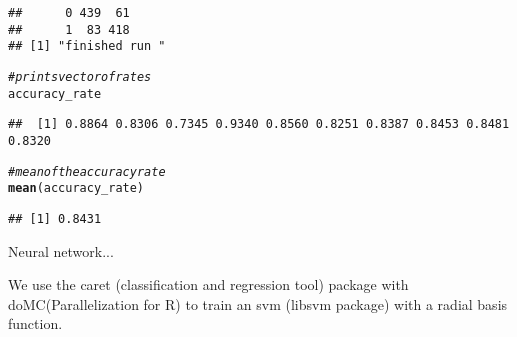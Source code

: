 \documentclass[titlepage]{article}\usepackage[]{graphicx}\usepackage[]{color}
\makeatletter
\newcommand{\hlcom}[1]{\textcolor[rgb]{0.678,0.584,0.686}{\textit{#1}}}%
\newcommand{\hlstd}[1]{\textcolor[rgb]{0.345,0.345,0.345}{#1}}%
\newcommand{\hlkwd}[1]{\textcolor[rgb]{0.737,0.353,0.396}{\textbf{#1}}}%
\newenvironment{kframe}{%
 \def\at@end@of@kframe{}%
 \ifinner\ifhmode%
  \def\at@end@of@kframe{\end{minipage}}%
  \begin{minipage}{\columnwidth}%
 \fi\fi%
 \def\FrameCommand##1{\hskip\@totalleftmargin \hskip-\fboxsep
 \colorbox{shadecolor}{##1}\hskip-\fboxsep
     \hskip-\linewidth \hskip-\@totalleftmargin \hskip\columnwidth}%
 \MakeFramed {\advance\hsize-\width
   \@totalleftmargin\z@ \linewidth\hsize
   \@setminipage}}%
 {\par\unskip\endMakeFramed%
 \at@end@of@kframe}
\newenvironment{knitrout}{}{} %
\makeatother
\begin{document}
\begin{knitrout}
\begin{kframe}
\begin{verbatim}
##      0 439  61
##      1  83 418
## [1] "finished run "
\end{verbatim}
\begin{alltt}
\hlcom{# prints vector of rates}
\hlstd{accuracy_rate}
\end{alltt}
\begin{verbatim}
##  [1] 0.8864 0.8306 0.7345 0.9340 0.8560 0.8251 0.8387 0.8453 0.8481 0.8320
\end{verbatim}
\begin{alltt}
\hlcom{# mean of the accuracy rate}
\hlkwd{mean}\hlstd{(accuracy_rate)}
\end{alltt}
\begin{verbatim}
## [1] 0.8431
\end{verbatim}
\end{kframe}
\end{knitrout}

Neural network...


We use the caret (classification and regression tool) package with doMC(Parallelization for R) to train an svm (libsvm package) with a radial basis function.
\end{document}
